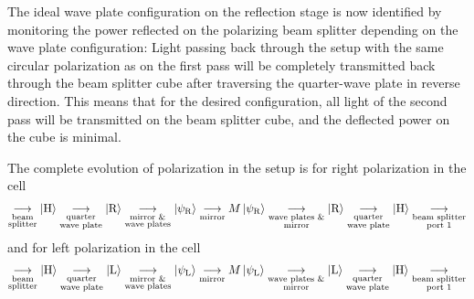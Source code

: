 The ideal wave plate configuration on the reflection stage is now identified by monitoring the power reflected on the polarizing beam splitter depending on the wave plate configuration: Light passing back through the setup with the same circular polarization as on the first pass will be completely transmitted back through the beam splitter cube after traversing the quarter-wave plate in reverse direction. This means that for the desired configuration, all light of the second pass will be transmitted on the beam splitter cube, and the deflected power on the cube is minimal.

The complete evolution of polarization in the setup is for right polarization in the cell
\begin{align}
    \label{eq:second_pass_waveplate_adjustment_cascade_r}
    \underset{\substack{\text{beam}\\\text{splitter}}}{\longrightarrow}
    \Ket{\text{H}} 
    \underset{\substack{\text{quarter}\\\text{wave plate}}}{\longrightarrow}
    \Ket{\text{R}}
    \underset{\substack{\text{mirror \&}\\\text{wave plates}}}{\longrightarrow}
    \Ket{\psi_\text{R}}
    \underset{\substack{\text{mirror}}}{\longrightarrow}
    M\Ket{\psi_\text{R}}
    \underset{\substack{\text{wave plates \&}\\\text{mirror}}}{\longrightarrow}
    \Ket{\text{R}}
    \underset{\substack{\text{quarter}\\\text{wave plate}}}{\longrightarrow}
    \Ket{\text{H}}
    \underset{\substack{\text{beam splitter}\\\text{port 1}}}{\longrightarrow}
\end{align}
and for left polarization in the cell
\begin{align}
    \label{eq:second_pass_waveplate_adjustment_cascade_l}
    \underset{\substack{\text{beam}\\\text{splitter}}}{\longrightarrow}
    \Ket{\text{H}} 
    \underset{\substack{\text{quarter}\\\text{wave plate}}}{\longrightarrow}
    \Ket{\text{L}}
    \underset{\substack{\text{mirror \&}\\\text{wave plates}}}{\longrightarrow}
    \Ket{\psi_\text{L}}
    \underset{\substack{\text{mirror}}}{\longrightarrow}
    M\Ket{\psi_\text{L}}
    \underset{\substack{\text{wave plates \&}\\\text{mirror}}}{\longrightarrow}
    \Ket{\text{L}}
    \underset{\substack{\text{quarter}\\\text{wave plate}}}{\longrightarrow}
    \Ket{\text{H}}
    \underset{\substack{\text{beam splitter}\\\text{port 1}}}{\longrightarrow}
\end{align}
